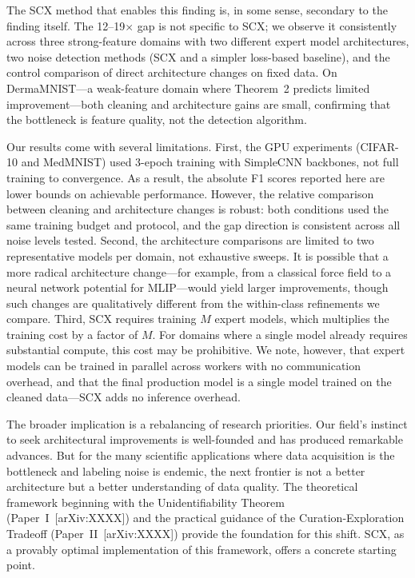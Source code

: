 The SCX method that enables this finding is, in some sense, secondary to the finding itself. The 12--19$\times$ gap is not specific to SCX; we observe it consistently across three strong-feature domains with two different expert model architectures, two noise detection methods (SCX and a simpler loss-based baseline), and the control comparison of direct architecture changes on fixed data. On DermaMNIST---a weak-feature domain where Theorem~2 predicts limited improvement---both cleaning and architecture gains are small, confirming that the bottleneck is feature quality, not the detection algorithm.

Our results come with several limitations. First, the GPU experiments (CIFAR-10 and MedMNIST) used 3-epoch training with SimpleCNN backbones, not full training to convergence. As a result, the absolute F1 scores reported here are lower bounds on achievable performance. However, the relative comparison between cleaning and architecture changes is robust: both conditions used the same training budget and protocol, and the gap direction is consistent across all noise levels tested. Second, the architecture comparisons are limited to two representative models per domain, not exhaustive sweeps. It is possible that a more radical architecture change---for example, from a classical force field to a neural network potential for MLIP---would yield larger improvements, though such changes are qualitatively different from the within-class refinements we compare. Third, SCX requires training $M$ expert models, which multiplies the training cost by a factor of $M$. For domains where a single model already requires substantial compute, this cost may be prohibitive. We note, however, that expert models can be trained in parallel across workers with no communication overhead, and that the final production model is a single model trained on the cleaned data---SCX adds no inference overhead.

The broader implication is a rebalancing of research priorities. Our field's instinct to seek architectural improvements is well-founded and has produced remarkable advances. But for the many scientific applications where data acquisition is the bottleneck and labeling noise is endemic, the next frontier is not a better architecture but a better understanding of data quality. The theoretical framework beginning with the Unidentifiability Theorem (Paper~I~[arXiv:XXXX]) and the practical guidance of the Curation-Exploration Tradeoff (Paper~II~[arXiv:XXXX]) provide the foundation for this shift. SCX, as a provably optimal implementation of this framework, offers a concrete starting point.

